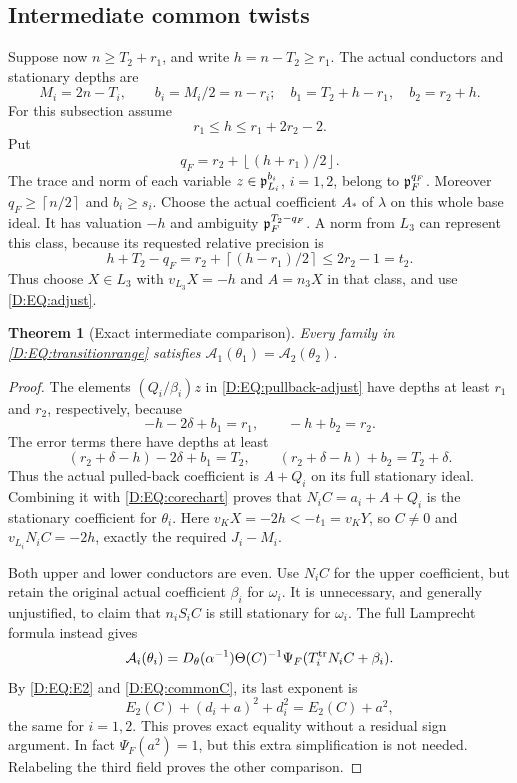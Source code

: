 \documentclass[11pt]{amsart}
\newtheorem{theorem}{Theorem}[section]
\theoremstyle{definition}
\theoremstyle{remark}
\newcommand{\ceil}[1]{\left\lceil #1\right\rceil}
\newcommand{\floor}[1]{\left\lfloor #1\right\rfloor}
\begin{document}
\subsection{Intermediate common twists}
Suppose now $n\ge T_2+r_1$, and write $h=n-T_2\ge r_1$.
The actual conductors and stationary depths are
\begin{equation}\label{D:EQ:twistdepths}
 M_i=2n-T_i,\qquad b_i=M_i/2=n-r_i;
 \quad b_1=T_2+h-r_1,\quad b_2=r_2+h.
\end{equation}
For this subsection assume
\begin{equation}\label{D:EQ:transitionrange}
 r_1\le h\le r_1+2r_2-2.
\end{equation}
Put
\[
 q_F=r_2+\floor{(h+r_1)/2}.
\]
The trace and norm of each variable $z\in\mathfrak p_{L_i}^{b_i}$, $i=1,2$,
belong to $\mathfrak p_F^{q_F}$. Moreover
$q_F\ge\ceil{n/2}$ and $b_i\ge s_i$.
Choose the actual coefficient $A_*$ of $\lambda$ on this whole
base ideal. It has valuation $-h$ and ambiguity $\mathfrak p_F^{T_2-q_F}$.
A norm from $L_3$ can represent this class, because its requested
relative precision is
\begin{equation}\label{D:EQ:transitionprecision}
 h+T_2-q_F=r_2+\ceil{(h-r_1)/2}\le2r_2-1=t_2.
\end{equation}
Thus choose $X\in L_3$ with $v_{L_3}X=-h$ and $A=n_3X$ in that
class, and use \eqref{D:EQ:adjust}.

\begin{theorem}[Exact intermediate comparison]\label{D:EQ:intermediate}
Every family in \eqref{D:EQ:transitionrange} satisfies
$\mathcal A_1(\theta_1)=\mathcal A_2(\theta_2)$.
\end{theorem}
\begin{proof}
The elements $(Q_i/\beta_i)z$ in \eqref{D:EQ:pullback-adjust} have depths
at least $r_1$ and $r_2$, respectively, because
\[
 -h-2\delta+b_1=r_1,\qquad -h+b_2=r_2.
\]
The error terms there have depths at least
\[
 (r_2+\delta-h)-2\delta+b_1=T_2,\qquad
 (r_2+\delta-h)+b_2=T_2+\delta.
\]
Thus the actual pulled-back coefficient is $A+Q_i$ on its full
stationary ideal. Combining it with \eqref{D:EQ:corechart} proves that
$N_iC=a_i+A+Q_i$ is the stationary coefficient for $\theta_i$.
Here $v_KX=-2h<-t_1=v_KY$, so $C\ne0$ and
$v_{L_i}N_iC=-2h$, exactly the required $J_i-M_i$.

Both upper and lower conductors are even. Use $N_iC$ for the upper
coefficient, but retain the original actual coefficient $\beta_i$
for $\omega_i$. It is unnecessary, and generally unjustified, to
claim that $n_iS_iC$ is still stationary for $\omega_i$.
The full Lamprecht formula instead gives
\[
 \mathcal A_i(\theta_i)
   =D_\theta(\alpha^{-1})\Theta(C)^{-1}
                    \Psi_F(T_i^{\rm tr}N_iC+\beta_i).
\]
By \eqref{D:EQ:E2} and \eqref{D:EQ:commonC}, its last exponent is
\[
 E_2(C)+(d_i+a)^2+d_i^2=E_2(C)+a^2,
\]
the same for $i=1,2$. This proves exact equality without a residual
sign argument. In fact $\Psi_F(a^2)=1$, but this extra simplification
is not needed. Relabeling the third field proves the other comparison.
\end{proof}
\end{document}
